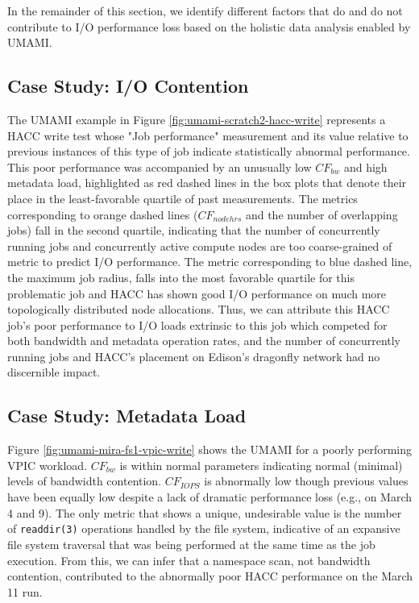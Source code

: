 In the remainder of this section, we identify different factors that do and do not contribute to I/O performance loss based on the holistic data analysis enabled by UMAMI.


\subsection{Case Study: I/O Contention}

The UMAMI example in Figure \ref{fig:umami-scratch2-hacc-write} represents a HACC write test whose "Job performance" measurement and its value relative to previous instances of this type of job indicate statistically abnormal performance.
This poor performance was accompanied by an unusually low $\mathit{CF}_{\mathit{bw}}$ and high metadata load, highlighted as red dashed lines in the box plots that denote their place in the least-favorable quartile of past measurements.
The metrics corresponding to orange dashed lines ($\mathit{CF}_{\mathit{nodehrs}}$ and the number of overlapping jobs) fall in the second quartile, indicating that the number of concurrently running jobs and concurrently active compute nodes are too coarse-grained of metric to predict I/O performance.
The metric corresponding to blue dashed line, the maximum job radius, falls into the most favorable quartile for this problematic job and HACC has shown good I/O performance on much more topologically distributed node allocations.
Thus, we can attribute this HACC job's poor performance to I/O loads extrinsic to this job which competed for both bandwidth and metadata operation rates, and the number of concurrently running jobs and HACC's placement on Edison's dragonfly network had no discernible impact.

\subsection{Case Study: Metadata Load}

Figure \ref{fig:umami-mira-fs1-vpic-write} shows the UMAMI for a poorly performing VPIC workload.
$\mathit{CF}_{\mathit{bw}}$ is within normal parameters indicating normal (minimal) levels of bandwidth contention.
$\mathit{CF}_{\mathit{IOPS}}$ is abnormally low though previous values have been equally low despite a lack of dramatic performance loss (e.g., on March 4 and 9).
The only metric that shows a unique, undesirable value is the number of \texttt{readdir(3)} operations handled by the file system, indicative of an expansive file system traversal that was being performed at the same time as the job execution.   From this, we can infer that a namespace scan, not bandwidth contention, contributed to the abnormally poor HACC performance on the March 11 run.

